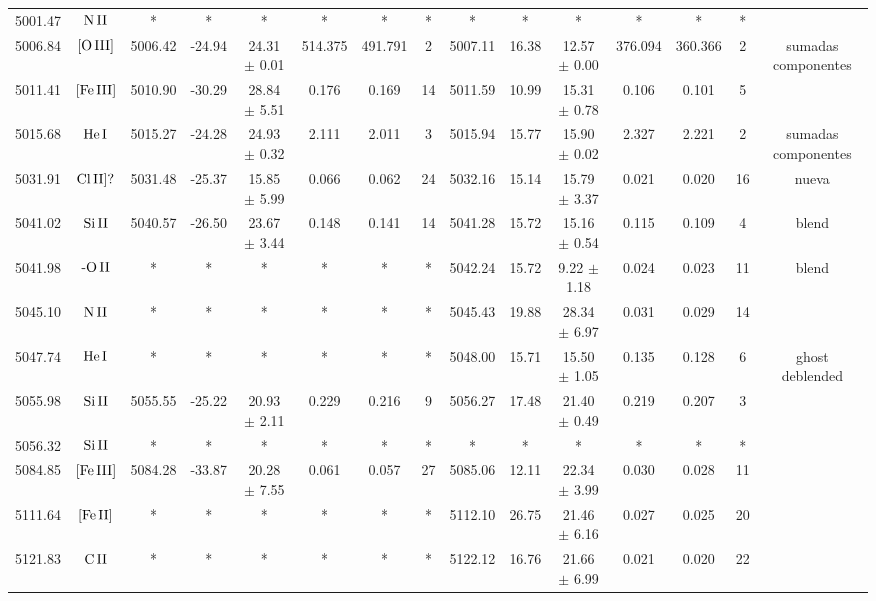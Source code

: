\documentclass{article}
\begin{document}
\begin{table*}
\begin{adjustbox}{width=\textwidth}
\begin{tabular}{ccccccccccccccc}
5001.47 & $\mbox{N}\thinspace \mbox{II}$ & * & * & * & * & * & * & * & * & * & * & * & * &  \\
5006.84 & $\mbox{[O}\thinspace \mbox{III]}$ & 5006.42 & -24.94 & 24.31 $\pm$ 0.01 & 514.375 & 491.791 & 2 & 5007.11 & 16.38 & 12.57 $\pm$ 0.00 & 376.094 & 360.366 & 2 &  sumadas componentes \\
5011.41 & $\mbox{[Fe}\thinspace \mbox{III]}$ & 5010.90 & -30.29 & 28.84 $\pm$ 5.51 & 0.176 & 0.169 & 14 & 5011.59 & 10.99 & 15.31 $\pm$ 0.78 & 0.106 & 0.101 & 5 &  \\
5015.68 & $\mbox{He}\thinspace \mbox{I}$ & 5015.27 & -24.28 & 24.93 $\pm$ 0.32 & 2.111 & 2.011 & 3 & 5015.94 & 15.77 & 15.90 $\pm$ 0.02 & 2.327 & 2.221 & 2 &  sumadas componentes \\
5031.91 & $\mbox{Cl}\thinspace \mbox{II]?}$ & 5031.48 & -25.37 & 15.85 $\pm$ 5.99 & 0.066 & 0.062 & 24 & 5032.16 & 15.14 & 15.79 $\pm$ 3.37 & 0.021 & 0.020 & 16 &  nueva \\
5041.02 & $\mbox{Si}\thinspace \mbox{II}$ & 5040.57 & -26.50 & 23.67 $\pm$ 3.44 & 0.148 & 0.141 & 14 & 5041.28 & 15.72 & 15.16 $\pm$ 0.54 & 0.115 & 0.109 & 4 &  blend \\
5041.98 & $\mbox{-O}\thinspace \mbox{II}$ & * & * & * & * & * & * & 5042.24 & 15.72 & 9.22 $\pm$ 1.18 & 0.024 & 0.023 & 11 &  blend \\
5045.10 & $\mbox{N}\thinspace \mbox{II}$ & * & * & * & * & * & * & 5045.43 & 19.88 & 28.34 $\pm$ 6.97 & 0.031 & 0.029 & 14 &  \\
5047.74 & $\mbox{He}\thinspace \mbox{I}$ & * & * & * & * & * & * & 5048.00 & 15.71 & 15.50 $\pm$ 1.05 & 0.135 & 0.128 & 6 &  ghost deblended \\
5055.98 & $\mbox{Si}\thinspace \mbox{II}$ & 5055.55 & -25.22 & 20.93 $\pm$ 2.11 & 0.229 & 0.216 & 9 & 5056.27 & 17.48 & 21.40 $\pm$ 0.49 & 0.219 & 0.207 & 3 &  \\
5056.32 & $\mbox{Si}\thinspace \mbox{II}$ & * & * & * & * & * & * & * & * & * & * & * & * &  \\
5084.85 & $\mbox{[Fe}\thinspace \mbox{III]}$ & 5084.28 & -33.87 & 20.28 $\pm$ 7.55 & 0.061 & 0.057 & 27 & 5085.06 & 12.11 & 22.34 $\pm$ 3.99 & 0.030 & 0.028 & 11 &  \\
5111.64 & $\mbox{[Fe}\thinspace \mbox{II]}$ & * & * & * & * & * & * & 5112.10 & 26.75 & 21.46 $\pm$ 6.16 & 0.027 & 0.025 & 20 &  \\
5121.83 & $\mbox{C}\thinspace \mbox{II}$ & * & * & * & * & * & * & 5122.12 & 16.76 & 21.66 $\pm$ 6.99 & 0.021 & 0.020 & 22 &  \\

\end{tabular}
\end{adjustbox}
\end{table*}
\end{document}
